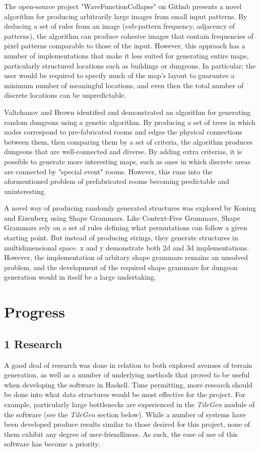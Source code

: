 \documentclass{article}
\begin{document}
The open-source project "WaveFunctionCollapse" on Github presents a novel algorithm for producing arbitrarily large images from small input patterns.\cite{wfc-report} By deducing a set of rules from an image (sub-pattern frequency, adjacency of patterns), the algorithm can produce cohesive images that contain frequencies of pixel patterns comparable to those of the input. However, this approach has a number of implementations that make it less suited for generating entire maps, particularly structured locations such as buildings or dungeons. In particular; the user would be required to specify much of the map's layout to guaruntee a minimum number of meaningful locations, and even then the total number of discrete locations can be unpredictable.



Valtchanov and Brown identified and demonstrated an algorithm for generating random dungeons using a genetic algorithm\cite{genetic}. By producing a set of trees in which nodes correspond to pre-fabricated rooms and edges the physical connections between them, then comparing them by a set of criteria, the algorithm produces dungeons that are well-connected and diverse. By adding extra criterias, it is possible to generate more interesting maps, such as ones in which discrete areas are connected by "special event" rooms. However, this runs into the aformentioned problem of prefabricated rooms becoming predictable and uninteresting.



A novel way of producing randomly generated structures was explored by Koning and Eizenberg using Shape Grammars.\cite{koning1981language} Like Context-Free Grammars, Shape Grammars rely on a set of rules defining what permutations can follow a given starting point. But instead of producing strings, they generate structures in multidimensional space. x and y demonstrate both 2d and 3d implementations. However, the implementation of arbitary shape grammars remains an unsolved problem, and the development of the required shape grammars for dungeon generation would in itself be a large undertaking.

\section{Progress}

\subsection{1 Research}
A good deal of research was done in relation to both explored avenues of terrain generation, as well as a number of underlying methods that proved to be useful when developing the software in Haskell. Time permitting, more research should be done into what data structures would be most effective for the project. For example, particularly large bottlenecks are experienced in the \textit{TileGen} module of the software (see the \textit{TileGen} section below). While a number of systems have been developed produce results similar to those desired for this project, none of them exhibit any degree of user-friendliness. As such, the ease of use of this software has become a priority.
\end{document}
